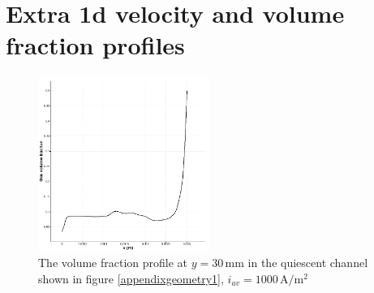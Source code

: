 \section*{Extra 1d velocity and volume fraction profiles}

\begin{figure}[H]
    \centering
    \includegraphics[width = 0.5\textwidth]{volumeprofileappendix.png}
    \caption{The volume fraction profile at $y = 30 \, \mathrm{mm}$ in the quiescent channel shown in figure \ref{appendixgeometry1}, $i_{av}=1000 \, \mathrm{A/m^2}$}
    \label{pseudovolume}
\end{figure}

